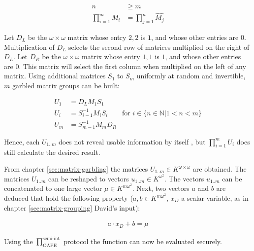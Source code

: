 \begin{align*}
n & \geq m \\
\prod_{i=1}^m M_i & = \prod_{j=1}^n \widehat{M_j}
\end{align*}

\label{sec:matrix-garbling}

Let $D_L$ be the $\omega \times \omega$ matrix whose entry $2,2$ is $1$, and
whose other entries are $0$. Multiplication of $D_L$ selects the second row of
matrices multiplied on the right of $D_L$. Let $D_R$ be the $\omega \times
\omega$ matrix whose entry $1,1$ is $1$, and whose other entries are $0$. This
matrix will select the first column when multiplied on the left of any matrix.
Using additional matrices $S_1$ to $S_{m}$ uniformly at random and invertible,
$m$ garbled matrix groups can be built:

\begin{align*}
U_1 & = D_L M_1 S_1 \\
U_i & = S_{i-1}^{-1} M_i S_i &
\text{for $i \in \{n \in \mathbb{N} \big| 1 < n < m\}$}\\
U_m & = S_{m-1}^{-1} M_m D_R
\end{align*}

\noindent{} Hence, each $U_{1..m}$ does not reveal usable information by itself
\cite{cramer03}, but $\prod_{i=1}^m U_i$ does still calculate the desired
result.



From chapter \ref{sec:matrix-garbling} the matrices $U_{1..m} \in K^{\omega
\times \omega}$ are obtained. The matrices $U_{1..m}$ can be reshaped to vectors
$u_{1..m} \in K^{\omega^2}$. The vectors $u_{1..m}$ can be concatenated to one
large vector $\mu \in K^{m\omega^2}$. Next, two vectors $a$ and $b$ are deduced
that hold the following property ($a, b \in K^{m\omega^2}$, $x_D$ a scalar
variable, as in chapter \ref{sec:matrix-grouping} David's input):

\begin{align}
a \cdot x_D + b = \mu
\end{align}

Using the $\prod^{\text{semi-int}}_{\text{OAFE}}$ protocol\cite{davidgoliath}
the function can now be evaluated securely.

